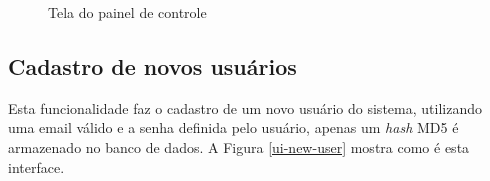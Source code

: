 \begin{figure}[H]
\caption{\label{ui-dashboard} Tela do painel de controle}
\end{figure}

\subsection{Cadastro de novos usuários}
Esta funcionalidade faz o cadastro de um novo usuário do sistema, utilizando uma email válido e a senha definida pelo usuário, apenas um \textit{hash} MD5 é armazenado no banco de dados. A Figura \ref{ui-new-user} mostra como é esta interface.

